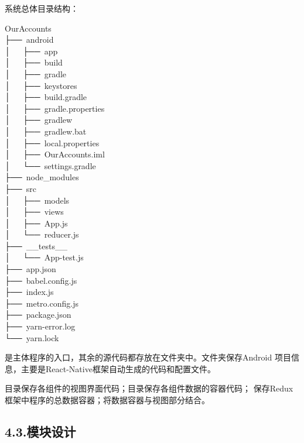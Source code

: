 \documentclass{article}
\begin{document}
\noindent{}系统总体目录结构：%
\begin{mdpre}%
\noindent OurAccounts\\
├──~android\\
│~~~├──~app\\
│~~~├──~build\\
│~~~├──~gradle\\
│~~~├──~keystores\\
│~~~├──~build.gradle\\
│~~~├──~gradle.properties\\
│~~~├──~gradlew\\
│~~~├──~gradlew.bat\\
│~~~├──~local.properties\\
│~~~├──~OurAccounts.iml\\
│~~~└──~settings.gradle\\
├──~node\_modules\\
├──~src\\
│~~~├──~models\\
│~~~├──~views\\
│~~~├──~App.js\\
│~~~└──~reducer.js\\
├──~\_\_tests\_\_\\
│~~~└──~App-test.js\\
├──~app.json\\
├──~babel.config.js\\
├──~index.js\\
├──~metro.config.js\\
├──~package.json\\
├──~yarn-error.log\\
└──~yarn.lock%
\end{mdpre}\noindent{}是主体程序的入口，其余的源代码都存放在文件夹中。文件夹保存Android
项目信息，主要是React-Native框架自动生成的代码和配置文件。

目录保存各组件的视图界面代码；目录保存各组件数据的容器代码；
保存Redux框架中程序的总数据容器；将数据容器与视图部分结合。%

\subsection{4.3.\hspace*{0.5em}模块设计}\label{section}%
\end{document}
